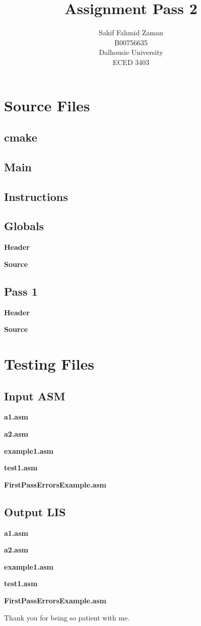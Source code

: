 \documentclass[titlepage, 10pt]{article}
\title{Assignment Pass 2}
\author{Sakif Fahmid Zaman\\B00756635\\Dalhousie University\\ECED 3403}
\begin{document}
\maketitle
\tableofcontents
\clearpage

\section{Source Files}
\subsection{cmake}


\subsection{Main}


\subsection{Instructions}


\subsection{Globals}
\textbf{Header}

\textbf{Source}


\clearpage
\subsection{Pass 1}
\textbf{Header}

\textbf{Source}


\clearpage
\section{Testing Files}
\subsection{Input ASM}
\textbf{a1.asm}

\textbf{a2.asm}

\textbf{example1.asm}

\textbf{test1.asm}

\textbf{FirstPassErrorsExample.asm}


\subsection{Output LIS}
\textbf{a1.asm}

\textbf{a2.asm}

\textbf{example1.asm}

\textbf{test1.asm}

\textbf{FirstPassErrorsExample.asm}


Thank you for being so patient with me.
\end{document}
